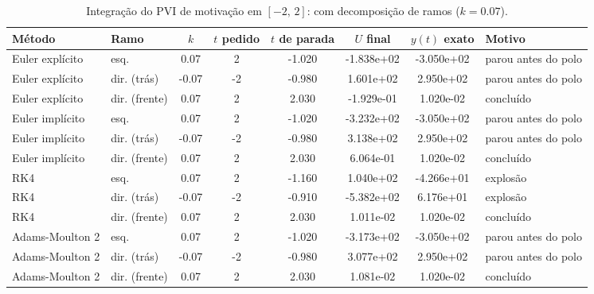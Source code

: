 \begin{table}[H]
    \centering
    \small
    \begin{tabular}{llcccccl}
        \hline
        Método & Ramo & $k$ & $t$ pedido & $t$ de parada & $U$ final & $y(t)$ exato & Motivo \\
        \hline
        Euler explícito & esq. & 0.07 & 2 & -1.020 & -1.838e+02 & -3.050e+02 & parou antes do polo \\
        Euler explícito & dir. (trás) & -0.07 & -2 & -0.980 & 1.601e+02 & 2.950e+02 & parou antes do polo \\
        Euler explícito & dir. (frente) & 0.07 & 2 & 2.030 & -1.929e-01 & 1.020e-02 & concluído \\
        Euler implícito & esq. & 0.07 & 2 & -1.020 & -3.232e+02 & -3.050e+02 & parou antes do polo \\
        Euler implícito & dir. (trás) & -0.07 & -2 & -0.980 & 3.138e+02 & 2.950e+02 & parou antes do polo \\
        Euler implícito & dir. (frente) & 0.07 & 2 & 2.030 & 6.064e-01 & 1.020e-02 & concluído \\
        RK4 & esq. & 0.07 & 2 & -1.160 & 1.040e+02 & -4.266e+01 & explosão \\
        RK4 & dir. (trás) & -0.07 & -2 & -0.910 & -5.382e+02 & 6.176e+01 & explosão \\
        RK4 & dir. (frente) & 0.07 & 2 & 2.030 & 1.011e-02 & 1.020e-02 & concluído \\
        Adams-Moulton 2 & esq. & 0.07 & 2 & -1.020 & -3.173e+02 & -3.050e+02 & parou antes do polo \\
        Adams-Moulton 2 & dir. (trás) & -0.07 & -2 & -0.980 & 3.077e+02 & 2.950e+02 & parou antes do polo \\
        Adams-Moulton 2 & dir. (frente) & 0.07 & 2 & 2.030 & 1.081e-02 & 1.020e-02 & concluído \\
        \hline
    \end{tabular}
    \caption{Integração do PVI de motivação em $[-2,\, 2]$: com decomposição de ramos ($k = 0.07$).}
    \label{tab:m2_2_cd_k07}
\end{table}
